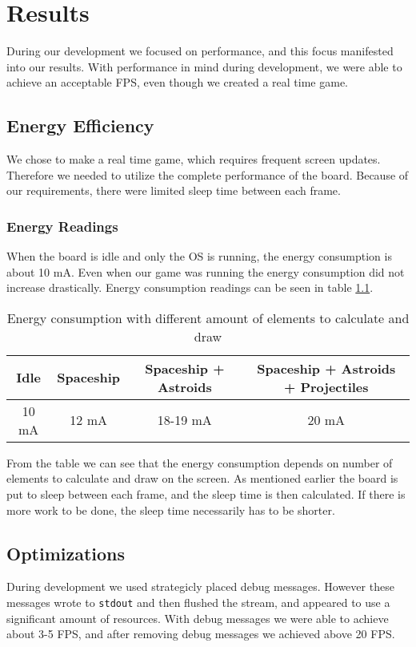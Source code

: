 \chapter{Results}
During our development we focused on performance, and this focus manifested into our results. With performance in mind during development, we were able to achieve an acceptable FPS, even though we created a real time game.

\section{Energy Efficiency}
We chose to make a real time game, which requires frequent screen updates. Therefore we needed to utilize the complete performance of the board. Because of our requirements, there were limited sleep time between each frame.

\subsection{Energy Readings}
When the board is idle and only the OS is running, the energy consumption is about 10 mA. Even when our game was running the energy consumption did not increase drastically. Energy consumption readings can be seen in table \ref{tab:energy-with-game}.

\begin{table}[H]
	\begin{center}
	\begin{tabular}{ |c|c|c|c| }
	  \hline
	  Idle & Spaceship & Spaceship + Astroids & Spaceship + Astroids + Projectiles \\
	  \hline
	  10 mA & 12 mA & 18-19 mA & 20 mA \\
	  \hline

	\end{tabular}
	\caption{Energy consumption with different amount of elements to calculate and draw}
	\label{tab:energy-with-game}
	\end{center}
\end{table}

From the table we can see that the energy consumption depends on number of elements to calculate and draw on the screen. As mentioned earlier the board is put to sleep between each frame, and the sleep time is then calculated. If there is more work to be done, the sleep time necessarily has to be shorter.

\section{Optimizations}
During development we used strategicly placed debug messages. However these messages wrote to \texttt{stdout} and then flushed the stream, and appeared to use a significant amount of resources. With debug messages we were able to achieve about 3-5 FPS, and after removing debug messages we achieved above 20 FPS.